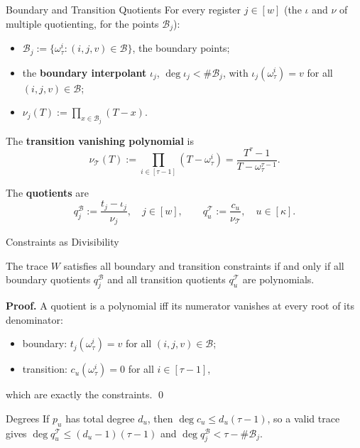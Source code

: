 \documentclass{zkdl-presentation-template}
\begin{document}
    \begin{frame}{Boundary and Transition Quotients}
        For every register $j \in [w]$ (the $\iota$ and $\nu$ of multiple quotienting, for the points $\mathcal{B}_j$):
        \begin{itemize}
            \item $\mathcal{B}_j := \{\omega_\tau^i : (i, j, v) \in \mathcal{B}\}$, the boundary points;
            \item the \textbf{boundary interpolant} $\iota_j$, $\deg \iota_j < \#\mathcal{B}_j$, with $\iota_j(\omega_\tau^i) = v$ for all $(i, j, v) \in \mathcal{B}$;
            \item $\nu_j(T) := \prod_{x \in \mathcal{B}_j} (T - x)$.
        \end{itemize}
        \pause

        The \textbf{transition vanishing polynomial} is
        \begin{equation*}
            \nu_{\mathcal{T}}(T) := \prod_{i \in [\tau - 1]} (T - \omega_\tau^i) = \frac{T^\tau - 1}{T - \omega_\tau^{\tau - 1}}.
        \end{equation*}
        \pause
        \vspace{-5pt}

        The \textbf{quotients} are
        \begin{equation*}
            q^{\mathcal{B}}_j := \frac{t_j - \iota_j}{\nu_j}, \quad j \in [w], \qquad q^{\mathcal{T}}_u := \frac{c_u}{\nu_{\mathcal{T}}}, \quad u \in [\kappa].
        \end{equation*}
    \end{frame}

    \begin{frame}{Constraints as Divisibility}
        \begin{proposition}
            The trace $W$ satisfies all boundary and transition constraints if and only if all boundary quotients $q^{\mathcal{B}}_j$ and all transition quotients $q^{\mathcal{T}}_u$ are polynomials.
        \end{proposition}
        \pause

        \textbf{Proof.} A quotient is a polynomial iff its numerator vanishes at every root of its denominator:
        \begin{itemize}
            \item boundary: $t_j(\omega_\tau^i) = v$ for all $(i, j, v) \in \mathcal{B}$;
            \item transition: $c_u(\omega_\tau^i) = 0$ for all $i \in [\tau - 1]$,
        \end{itemize}
        which are exactly the constraints. \qed
        \pause

        \begin{remarkblock}{Degrees}
            If $p_u$ has total degree $d_u$, then $\deg c_u \leq d_u(\tau - 1)$, so a valid trace gives $\deg q^{\mathcal{T}}_u \leq (d_u - 1)(\tau - 1)$ and $\deg q^{\mathcal{B}}_j < \tau - \#\mathcal{B}_j$.
        \end{remarkblock}
    \end{frame}
\end{document}
